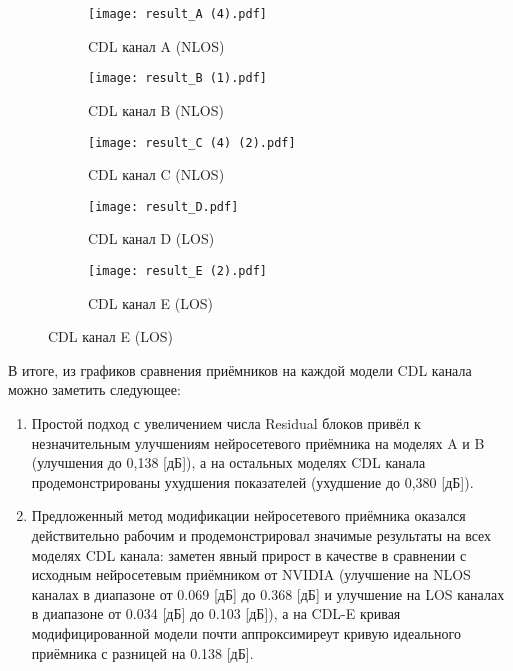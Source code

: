 \documentclass{article}
\begin{document}
\begin{figure}[H]
    \centering
    \begin{subfigure}{0.49\textwidth}
        \centering
        \texttt{[image: result\_A (4).pdf]}
        \caption{CDL канал A (NLOS)}
        \label{fig:channel_B}
    \end{subfigure}

    \vspace{0.7cm}
    
    \begin{subfigure}{0.49\textwidth}
        \centering
        \texttt{[image: result\_B (1).pdf]}
        \caption{CDL канал B (NLOS)}
        \label{fig:channel_B}
    \end{subfigure}
    \hfill
    \begin{subfigure}{0.49\textwidth}
        \centering
        \texttt{[image: result\_C (4) (2).pdf]}
        \caption{CDL канал C (NLOS)}
        \label{fig:channel_C}
    \end{subfigure}
    
    \vspace{0.7cm}
    
    \begin{subfigure}{0.49\textwidth}
        \centering
        \texttt{[image: result\_D.pdf]}
        \caption{CDL канал D (LOS)}
        \label{fig:channel_D}
    \end{subfigure}
    \hfill
    \begin{subfigure}{0.49\textwidth}
        \centering
        \texttt{[image: result\_E (2).pdf]}
        \caption{CDL канал E (LOS)}
        \label{fig:channel_E}
    \end{subfigure}
\end{figure}

\bigskip
В итоге, из графиков сравнения приёмников на каждой модели CDL канала можно заметить следующее:

\begin{enumerate}
    \item Простой подход с увеличением числа Residual блоков привёл к незначительным улучшениям нейросетевого приёмника на моделях A и B (улучшения до 0,138 [дБ]), а на остальных моделях CDL канала продемонстрированы ухудшения показателей (ухудшение до 0,380 [дБ]).
    \item Предложенный метод модификации нейросетевого приёмника оказался действительно рабочим и продемонстрировал значимые результаты на всех моделях CDL канала: заметен явный прирост в качестве в сравнении с исходным нейросетевым приёмником от NVIDIA (улучшение на NLOS каналах в диапазоне от 0.069 [дБ] до 0.368 [дБ] и улучшение на LOS каналах в диапазоне от 0.034 [дБ] до 0.103 [дБ]), а на CDL-E кривая модифицированной модели почти аппроксимиреут кривую идеального приёмника с разницей на 0.138 [дБ].
\end{enumerate}
\end{document}
